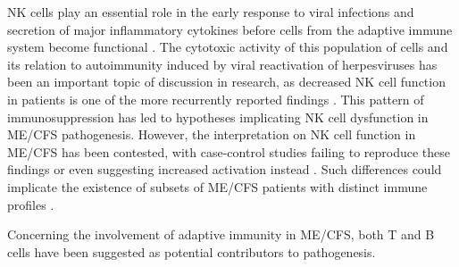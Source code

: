 NK cells play an essential role in the early response to viral infections and secretion of major inflammatory cytokines before cells from the adaptive immune system become functional \citep{janeway2017Immunology}.
The cytotoxic activity of this population of cells and its relation to autoimmunity induced by viral reactivation of herpesviruses has been an important topic of discussion in \cfs research, as decreased NK cell function in patients is one of the more recurrently reported findings \citep{caligiuri1987PhenotypicFunctional, klimas1990ImmunologicAbnormalitiesa, aoki1993LowNK, fletcher2010BiomarkersChronic, hardcastle2014AnalysisRelationship}.
This pattern of immunosuppression has led to hypotheses implicating NK cell dysfunction in ME/CFS pathogenesis.
However, the interpretation on NK cell function in ME/CFS has been contested, with case-control studies failing to reproduce these findings \citep{theorell2017UnperturbedCytotoxica, cliff2019CellularImmune} or even suggesting increased activation instead \citep{rivasAssociationNKCell2018}.
Such differences could implicate the existence of subsets of ME/CFS patients with distinct immune profiles \citep{zhang2017NKCell}.


Concerning the involvement of adaptive immunity in ME/CFS, both T and B cells have been suggested as potential contributors to pathogenesis.

